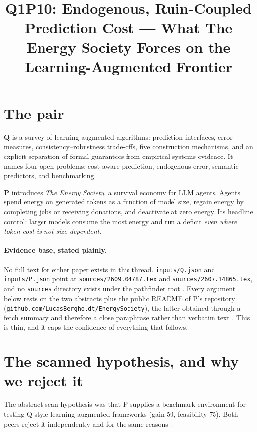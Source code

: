 \documentclass{article}
\title{Q1P10: Endogenous, Ruin-Coupled Prediction Cost --- What The Energy Society Forces on the Learning-Augmented Frontier}
\begin{document}
\maketitle

\section{The pair}

\textbf{Q} is a survey of learning-augmented algorithms: prediction interfaces, error
measures, consistency--robustness trade-offs, five construction mechanisms, and an
explicit separation of formal guarantees from empirical systems evidence. It names four
open problems: cost-aware prediction, endogenous error, semantic predictors, and
benchmarking.

\textbf{P} introduces \emph{The Energy Society}, a survival economy for LLM agents.
Agents spend energy on generated tokens as a function of model size, regain energy by
completing jobs or receiving donations, and deactivate at zero energy. Its headline
control: larger models consume the most energy and run a deficit \emph{even where token
cost is not size-dependent}.

\paragraph{Evidence base, stated plainly.} No full text for either paper exists in this
thread. \texttt{inputs/Q.json} and \texttt{inputs/P.json} point at
\texttt{sources/2609.04787.tex} and \texttt{sources/2607.14865.tex}, and no
\texttt{sources} directory exists under the pathfinder root . Every argument
below rests on the two abstracts plus the public README of P's repository
(\texttt{github.com/LucasBergholdt/EnergySociety}), the latter obtained through a fetch
summary and therefore a close paraphrase rather than verbatim text . This
is thin, and it caps the confidence of everything that follows.

\section{The scanned hypothesis, and why we reject it}

The abstract-scan hypothesis was that P supplies a benchmark environment for testing
Q-style learning-augmented frameworks (gain 50, feasibility 75). Both peers reject it
independently and for the same reasons :
\end{document}
